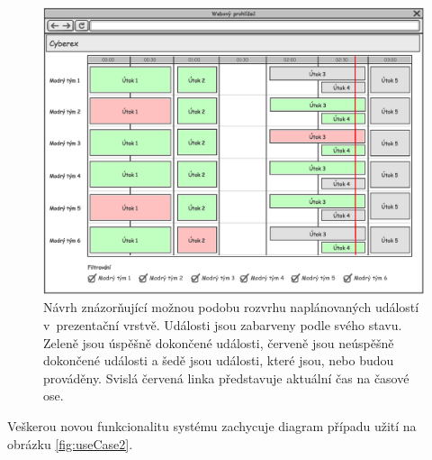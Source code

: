 \documentclass[
  digital,
  twoside,
  table, 
  nolof, 
  nolot
]{fithesis3}
\begin{document}
\begin{figure}
    \centering
    \includegraphics[width=13cm]{images/Web-Wireframe1.eps}
    \caption{Návrh znázorňující možnou podobu rozvrhu naplánovaných událostí v~prezentační vrstvě. Události jsou zabarveny podle svého stavu. Zeleně jsou úspěšně dokončené události, červeně jsou neúspěšně dokončené události a šedě jsou události, které jsou, nebo budou prováděny. Svislá červená linka představuje aktuální čas na časové ose.}
    \label{fig:wireframeTimetable}
\end{figure}

Veškerou novou funkcionalitu systému zachycuje diagram případu užití na obrázku \ref{fig:useCase2}.
\end{document}
